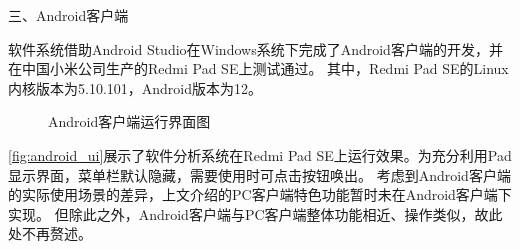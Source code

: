 
三、Android客户端

软件系统借助Android Studio在Windows系统下完成了Android客户端的开发，并在中国小米公司生产的Redmi Pad SE上测试通过。
其中，Redmi Pad SE的Linux内核版本为5.10.101，Android版本为12。
\begin{figure}[htbp]
    \centering
    \quad
    \caption{\label{fig:android_ui}Android客户端运行界面图}
\end{figure}


\autoref{fig:android_ui}展示了软件分析系统在Redmi Pad SE上运行效果。为充分利用Pad显示界面，菜单栏默认隐藏，需要使用时可点击按钮唤出。
考虑到Android客户端的实际使用场景的差异，上文介绍的PC客户端特色功能暂时未在Android客户端下实现。
但除此之外，Android客户端与PC客户端整体功能相近、操作类似，故此处不再赘述。





